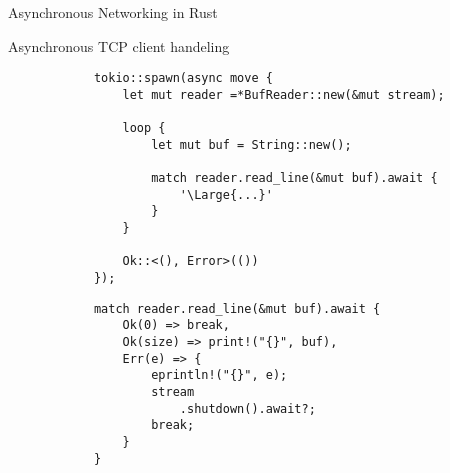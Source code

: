 \begin{frame}[fragile]{Asynchronous Networking in Rust}
    \begin{block}{Asynchronous TCP client handeling}
        \begin{overprint}
            \begin{verbatim}
            tokio::spawn(async move {
                let mut reader =*BufReader::new(&mut stream);
            
                loop {
                    let mut buf = String::new();
            
                    match reader.read_line(&mut buf).await {
                        '\Large{...}'
                    }
                }
            
                Ok::<(), Error>(())
            });
            \end{verbatim}

            \begin{verbatim}
            match reader.read_line(&mut buf).await {
                Ok(0) => break,
                Ok(size) => print!("{}", buf),
                Err(e) => {
                    eprintln!("{}", e);
                    stream
                        .shutdown().await?;
                    break;
                }
            }
            \end{verbatim}
        \end{overprint}
    \end{block}

\end{frame}
